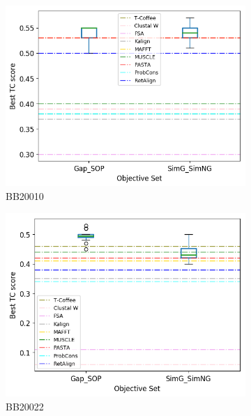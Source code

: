 \begin{figure}[!htbp]
\begin{adjustwidth}{-1cm}{-1cm}
\begin{subfigure}{0.22\textwidth}
			\includegraphics[width=\columnwidth]{Figure/summary/precomputedInit/Balibase/BB20010_objset_tc_rank_2}
			\caption{BB20010}
		\end{subfigure}
		\begin{subfigure}{0.22\textwidth}
			\includegraphics[width=\columnwidth]{Figure/summary/precomputedInit/Balibase/BB20022_objset_tc_rank_2}
			\caption{BB20022}
		\end{subfigure}
		\begin{subfigure}{0.22\textwidth}

\end{subfigure}
\end{adjustwidth}
\end{figure}
